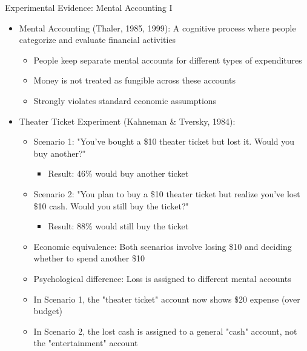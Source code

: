 \documentclass[10pt,handout]{beamer}
\begin{document}
\begin{frame}{Experimental Evidence: Mental Accounting I}
  \begin{itemize}[<+->]
    \item Mental Accounting (Thaler, 1985, 1999): A cognitive process where people categorize and evaluate financial activities
      \begin{itemize}
        \item People keep separate mental accounts for different types of expenditures
        \item Money is not treated as fungible across these accounts
        \item Strongly violates standard economic assumptions
      \end{itemize}
    \item Theater Ticket Experiment (Kahneman \& Tversky, 1984):
      \begin{itemize}
        \item Scenario 1: "You've bought a \$10 theater ticket but lost it. Would you buy another?"
          \begin{itemize}
            \item Result: 46\% would buy another ticket
          \end{itemize}
        \item Scenario 2: "You plan to buy a \$10 theater ticket but realize you've lost \$10 cash. Would you still buy the ticket?"
          \begin{itemize}
            \item Result: 88\% would still buy the ticket
          \end{itemize}
        \item Economic equivalence: Both scenarios involve losing \$10 and deciding whether to spend another \$10
        \item Psychological difference: Loss is assigned to different mental accounts
        \item In Scenario 1, the "theater ticket" account now shows \$20 expense (over budget)
        \item In Scenario 2, the lost cash is assigned to a general "cash" account, not the "entertainment" account
      \end{itemize}
  \end{itemize}
\end{frame}
\end{document}
